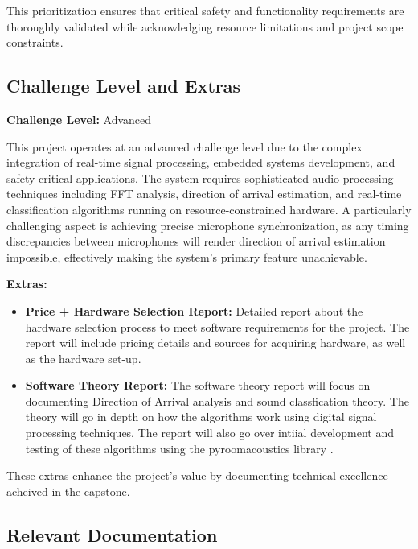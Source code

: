 \documentclass[12pt, titlepage]{article}
\begin{document}
This prioritization ensures that critical safety and functionality requirements
are thoroughly validated while acknowledging resource limitations and project
scope constraints.

\subsection{Challenge Level and Extras}

\textbf{Challenge Level:} Advanced

This project operates at an advanced challenge level due to the complex
integration of real-time signal processing, embedded systems development, and
safety-critical applications. The system requires sophisticated audio processing
techniques including FFT analysis, direction of arrival estimation, and
real-time classification algorithms running on resource-constrained hardware. A
particularly challenging aspect is achieving precise microphone synchronization,
as any timing discrepancies between microphones will render direction of arrival
estimation impossible, effectively making the system's primary feature
unachievable.
\newline

\textbf{Extras:}
\begin{itemize}
    \item \textbf{Price + Hardware Selection Report:} 
    Detailed report about the hardware selection process to meet software
    requirements for the project. The report will include pricing details
    and sources for acquiring hardware, as well as the hardware set-up.
    
    \item \textbf{Software Theory Report:} 
    The software theory report will focus on documenting Direction of Arrival
    analysis and sound classfication theory. The theory will go in depth on how 
    the algorithms work using digital signal processing techniques.
    The report will also go over intiial development and testing of these
    algorithms using the pyroomacoustics library \cite{pyroomacoustics}. 
\end{itemize}

These extras enhance the project's value by documenting technical excellence
acheived in the capstone.

\subsection{Relevant Documentation}
\end{document}
